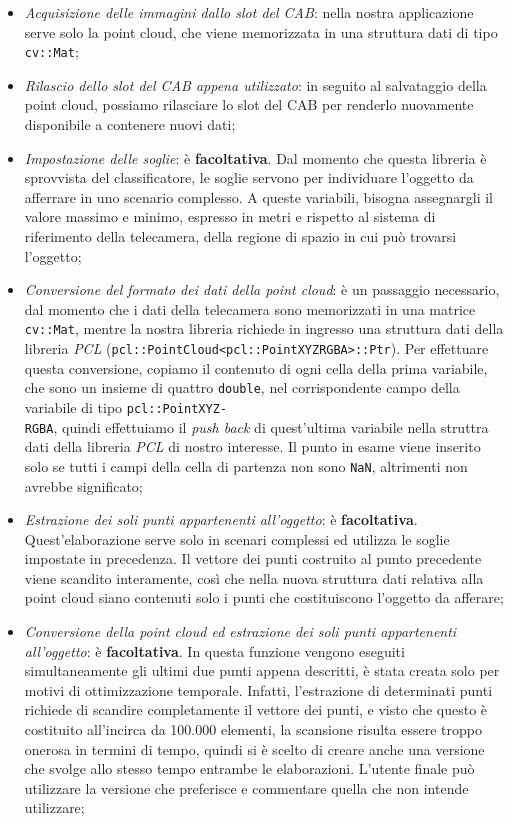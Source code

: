 \documentclass{report}
\begin{document}
\begin{itemize}
\item \textit{Acquisizione delle immagini dallo slot del CAB}: nella nostra applicazione serve solo la point cloud, che viene memorizzata in una struttura dati di tipo \texttt{cv::Mat};
\item \textit{Rilascio dello slot del CAB appena utilizzato}: in seguito al salvataggio della point cloud, possiamo rilasciare lo slot del CAB per renderlo nuovamente disponibile a contenere nuovi dati;
\item \textit{Impostazione delle soglie}: è \textbf{facoltativa}. Dal momento che questa libreria è sprovvista del classificatore, le soglie servono per individuare l'oggetto da afferrare in uno scenario complesso. A queste variabili, bisogna assegnargli il valore massimo e minimo, espresso in metri e rispetto al sistema di riferimento della telecamera, della regione di spazio in cui può trovarsi l'oggetto;
\item \textit{Conversione del formato dei dati della point cloud}: è un passaggio necessario, dal momento che i dati della telecamera sono memorizzati in una matrice \texttt{cv::Mat}, mentre la nostra libreria richiede in ingresso una struttura dati della libreria \textit{PCL} (\texttt{pcl::PointCloud<pcl::PointXYZRGBA>::Ptr}). Per effettuare questa conversione, copiamo il contenuto di ogni cella della prima variabile, che sono un insieme di quattro \texttt{double}, nel corrispondente campo della variabile di tipo \texttt{pcl::PointXYZ-}\\\texttt{RGBA}, quindi effettuiamo il \textit{push back} di quest'ultima variabile nella struttra dati della libreria \textit{PCL} di nostro interesse. Il punto in esame viene inserito solo se tutti i campi della cella di partenza non sono \texttt{NaN}, altrimenti non avrebbe significato;
\item \textit{Estrazione dei soli punti appartenenti all'oggetto}: è \textbf{facoltativa}. Quest'elaborazione serve solo in scenari complessi ed utilizza le soglie impostate in precedenza. Il vettore dei punti costruito al punto precedente viene scandito interamente, così che nella nuova struttura dati relativa alla point cloud siano contenuti solo i punti che costituiscono l'oggetto da afferare;
\item \textit{Conversione della point cloud ed estrazione dei soli punti appartenenti all'oggetto}: è \textbf{facoltativa}. In questa funzione vengono eseguiti simultaneamente gli ultimi due punti appena descritti, è stata creata solo per motivi di ottimizzazione temporale. Infatti, l'estrazione di determinati punti richiede di scandire completamente il vettore dei punti, e visto che questo è costituito all'incirca da 100.000 elementi, la scansione risulta essere troppo onerosa in termini di tempo, quindi si è scelto di creare anche una versione che svolge allo stesso tempo entrambe le elaborazioni. L'utente finale può utilizzare la versione che preferisce e commentare quella che non intende utilizzare;

\end{itemize}
\end{document}
